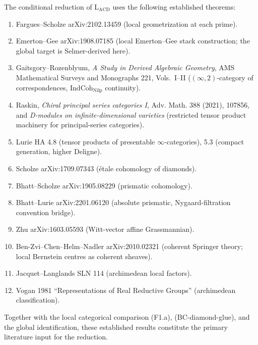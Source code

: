 \begin{proposition}
\label{v4-arith:acd:prop:dependency-closure}
The conditional reduction of
\(\mathrm{L}_{\mathrm{ACD}}\) uses the following established theorems:
\begin{enumerate}
\item Fargues--Scholze arXiv:2102.13459 (local geometrization at each
prime).
\item Emerton--Gee arXiv:1908.07185 (local Emerton--Gee stack
construction; the global target is Selmer-derived here).
\item Gaitsgory--Rozenblyum, \emph{A Study in Derived Algebraic
Geometry}, AMS Mathematical Surveys and Monographs 221, Vols.~I--II
(\((\infty,2)\)-category of correspondences,
\(\mathrm{IndCoh}_{\mathrm{Nilp}}\) continuity).
\item Raskin, \emph{Chiral principal series categories I}, Adv.
Math. 388 (2021), 107856, and \emph{D-modules on infinite-dimensional
varieties} (restricted tensor product machinery for principal-series
categories).
\item Lurie HA 4.8 (tensor products of presentable \(\infty\)-categories),
5.3 (compact generation, higher Deligne).
\item Scholze arXiv:1709.07343 (\'etale cohomology of diamonds).
\item Bhatt--Scholze arXiv:1905.08229 (prismatic cohomology).
\item Bhatt--Lurie arXiv:2201.06120 (absolute prismatic,
Nygaard-filtration convention bridge).
\item Zhu arXiv:1603.05593 (Witt-vector affine Grassmannian).
\item Ben-Zvi--Chen--Helm--Nadler arXiv:2010.02321 (coherent Springer
theory; local Bernstein centres as coherent sheaves).
\item Jacquet--Langlands SLN 114 (archimedean local factors).
\item Vogan 1981 ``Representations of Real Reductive Groups''
(archimedean classification).
\end{enumerate}
Together with the local categorical comparison (F1.a),
(BC-diamond-glue), and the global identification, these established
results constitute the primary literature input for the reduction.
\end{proposition}

